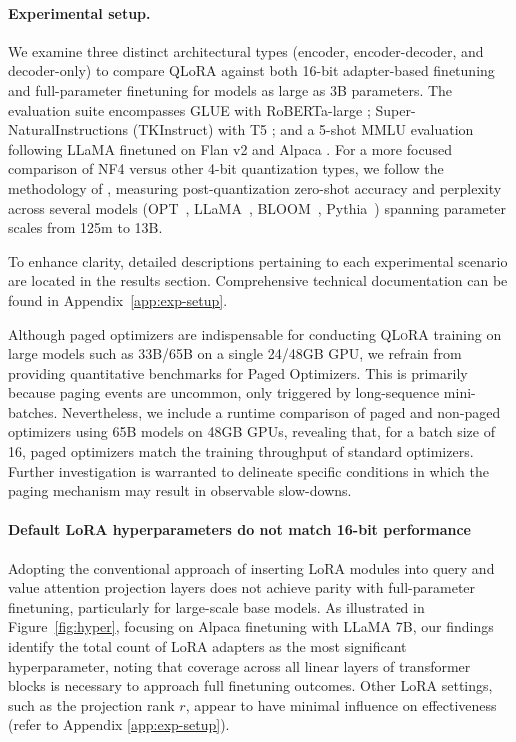 \paragraph{Experimental setup.} We examine three distinct architectural types (encoder, encoder-decoder, and decoder-only) to compare QLoRA against both 16-bit adapter-based finetuning and full-parameter finetuning for models as large as 3B parameters. The evaluation suite encompasses GLUE \citep{wang2018glue} with RoBERTa-large \citep{liu2019roberta}; Super-NaturalInstructions (TKInstruct) \citep{wang2022super} with T5 \citep{t5}; and a 5-shot MMLU \citep{hendrycksmeasuring} evaluation following LLaMA finetuned on Flan v2 \citep{longpre2023flan} and Alpaca \citep{alpaca}. For a more focused comparison of NF4 versus other 4-bit quantization types, we follow the methodology of \citet{dettmers2022case}, measuring post-quantization zero-shot accuracy and perplexity across several models (OPT~\citep{zhang2022opt}, LLaMA~\citep{touvron2023llama}, BLOOM~\citep{scao2022bloom}, Pythia~\citep{biderman2023pythia}) spanning parameter scales from 125m to 13B.

To enhance clarity, detailed descriptions pertaining to each experimental scenario are located in the results section. Comprehensive technical documentation can be found in Appendix~\ref{app:exp-setup}.

Although paged optimizers are indispensable for conducting \textsc{QLoRA} training on large models such as 33B/65B on a single 24/48GB GPU, we refrain from providing quantitative benchmarks for Paged Optimizers. This is primarily because paging events are uncommon, only triggered by long-sequence mini-batches. Nevertheless, we include a runtime comparison of paged and non-paged optimizers using 65B models on 48GB GPUs, revealing that, for a batch size of 16, paged optimizers match the training throughput of standard optimizers. Further investigation is warranted to delineate specific conditions in which the paging mechanism may result in observable slow-downs.

\paragraph{Default LoRA hyperparameters do not match 16-bit performance}

Adopting the conventional approach of inserting LoRA modules into query and value attention projection layers \citep{hu2021lora} does not achieve parity with full-parameter finetuning, particularly for large-scale base models. As illustrated in Figure~\ref{fig:hyper}, focusing on Alpaca finetuning with LLaMA 7B, our findings identify the total count of LoRA adapters as the most significant hyperparameter, noting that coverage across all linear layers of transformer blocks is necessary to approach full finetuning outcomes. Other LoRA settings, such as the projection rank $r$, appear to have minimal influence on effectiveness (refer to Appendix \ref{app:exp-setup}).

